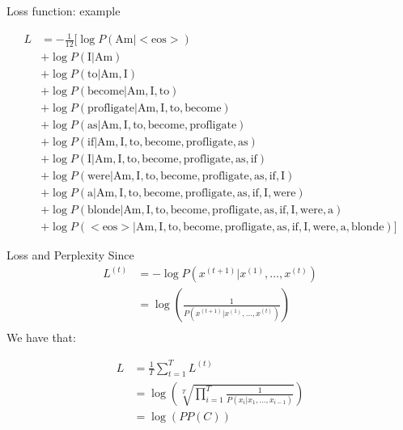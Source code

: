 \documentclass[10pt]{beamer}
\begin{document}
\begin{frame}{Loss function: example}

\begin{align*}
        L &=-\frac{1}{12}[\log P(\text{Am} | <\text{eos}>)\\
          &+ \log P(\text{I} | \text{Am})\\
          &+ \log P(\text{to}| \text{Am}, \text{I})\\
          &+ \log P(\text{become}| \text{Am}, \text{I}, \text{to})\\
		  &+ \log P(\text{profligate}| \text{Am}, \text{I}, \text{to}, \text{become})\\
          &+ \log P(\text{as}| \text{Am}, \text{I}, \text{to}, \text{become}, \text{profligate})\\
          &+ \log P(\text{if}| \text{Am}, \text{I}, \text{to}, \text{become}, \text{profligate}, \text{as})\\
          &+ \log P(\text{I}| \text{Am}, \text{I}, \text{to}, \text{become}, \text{profligate}, \text{as}, \text{if})\\
          &+ \log P(\text{were}| \text{Am}, \text{I}, \text{to}, \text{become}, \text{profligate}, \text{as}, \text{if}, \text{I})\\
          &+ \log P(\text{a}| \text{Am}, \text{I}, \text{to}, \text{become}, \text{profligate}, \text{as}, \text{if}, \text{I}, \text{were})\\
          &+ \log P(\text{blonde}| \text{Am}, \text{I}, \text{to}, \text{become}, \text{profligate}, \text{as}, \text{if}, \text{I}, \text{were}, \text{a})\\
          &+ \log P(<\text{eos}>| \text{Am}, \text{I}, \text{to}, \text{become}, \text{profligate}, \text{as}, \text{if}, \text{I}, \text{were}, \text{a}, \text{blonde})]
\end{align*}

\end{frame}

\begin{frame}{Loss and Perplexity}
Since
\begin{align*}
L^{(t)} & = - \log P(x^{(t+1)} |x^{(1)}, \dots, x^{(t)})\\
& =  \log(\frac{1}{P(x^{(t+1)}|x^{(1)}, \dots, x^{(t)})})\\
\end{align*}
We have that:

\begin{align*}
        L &=\frac{1}{T} \sum_{t=1}^{T} L^{(t)}\\
          &= \log\left( \sqrt[T]{\prod_{i=1}^{T}\frac{1}{P(x_i \vert x_1,\dots, x_{i-1})}} \right)\\
          &= \log(PP(C))
\end{align*}
\end{frame}
\end{document}
